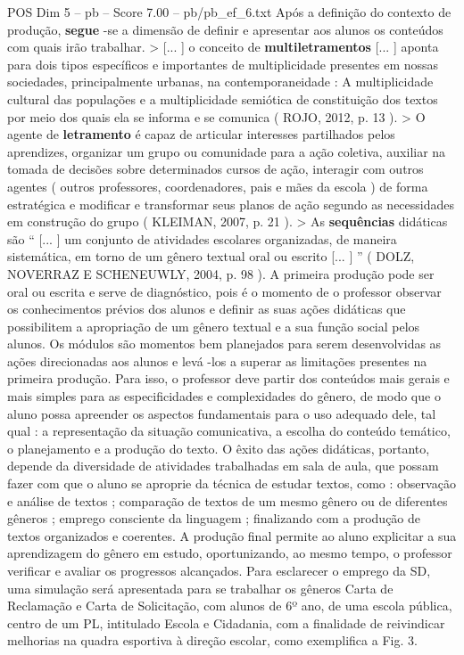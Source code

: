 \begin{textsample}{POS Dim 5 – pb – Score 7.00 – pb/pb\_ef\_6.txt}
Após a definição do contexto de produção, \textbf{segue} -se a dimensão de definir e apresentar aos alunos os conteúdos com quais irão trabalhar. > [... ] o conceito de \textbf{multiletramentos} [... ] aponta para dois tipos específicos e importantes de multiplicidade presentes em nossas sociedades, principalmente urbanas, na contemporaneidade : A multiplicidade cultural das populações e a multiplicidade semiótica de constituição dos textos por meio dos quais ela se informa e se comunica ( ROJO, 2012, p. 13 ). > O agente de \textbf{letramento} é capaz de articular interesses partilhados pelos aprendizes, organizar um grupo ou comunidade para a ação coletiva, auxiliar na tomada de decisões sobre determinados cursos de ação, interagir com outros agentes ( outros professores, coordenadores, pais e mães da escola ) de forma estratégica e modificar e transformar seus planos de ação segundo as necessidades em construção do grupo ( KLEIMAN, 2007, p. 21 ). > As \textbf{sequências} didáticas são “ [... ] um conjunto de atividades escolares organizadas, de maneira sistemática, em torno de um gênero textual oral ou escrito [... ] ” ( DOLZ, NOVERRAZ E SCHENEUWLY, 2004, p. 98 ).
A primeira produção pode ser oral ou escrita e serve de diagnóstico, pois é o momento de o professor observar os conhecimentos prévios dos alunos e definir as suas ações didáticas que possibilitem a apropriação de um gênero textual e a sua função social pelos alunos.
Os módulos são momentos bem planejados para serem desenvolvidas as ações direcionadas aos alunos e levá -los a superar as limitações presentes na primeira produção.
Para isso, o professor deve partir dos conteúdos mais gerais e mais simples para as especificidades e complexidades do gênero, de modo que o aluno possa apreender os aspectos fundamentais para o uso adequado dele, tal qual : a representação da situação comunicativa, a escolha do conteúdo temático, o planejamento e a produção do texto.
O êxito das ações didáticas, portanto, depende da diversidade de atividades trabalhadas em sala de aula, que possam fazer com que o aluno se aproprie da técnica de estudar textos, como : observação e análise de textos ; comparação de textos de um mesmo gênero ou de diferentes gêneros ; emprego consciente da linguagem ; finalizando com a produção de textos organizados e coerentes.
A produção final permite ao aluno explicitar a sua aprendizagem do gênero em estudo, oportunizando, ao mesmo tempo, o professor verificar e avaliar os progressos alcançados.
Para esclarecer o emprego da SD, uma simulação será apresentada para se trabalhar os gêneros Carta de Reclamação e Carta de Solicitação, com alunos de 6º ano, de uma escola pública, centro de um PL, intitulado Escola e Cidadania, com a finalidade de reivindicar melhorias na quadra esportiva à direção escolar, como exemplifica a Fig. 3.

\end{textsample}
